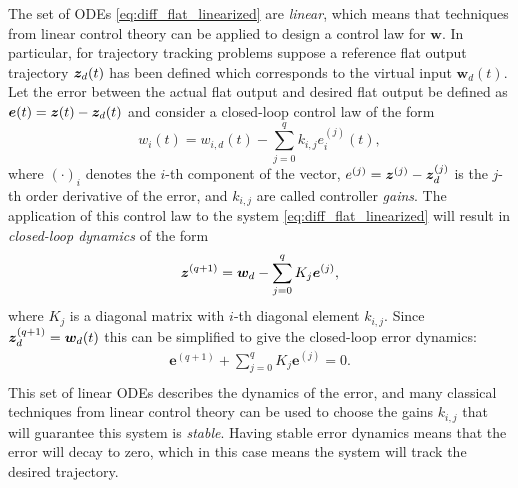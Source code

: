 The set of ODEs \eqref{eq:diff_flat_linearized} are \textit{linear}, which means that techniques from linear control theory can be applied to design a control law for $\bm{w}$. In particular, for trajectory tracking problems suppose a reference flat output trajectory $\bm{z}_d(t)$ has been defined which corresponds to the virtual input $\bm{w}_d(t)$. Let the error between the actual flat output and desired flat output be defined as $\bm{e}(t) = \bm{z}(t) - \bm{z}_d(t)$ and consider a closed-loop control law of the form
\begin{equation}
w_i(t) = w_{i,d}(t) - \sum_{j=0}^q k_{i,j} e_i^{(j)}(t),
\end{equation}
where $(\cdot)_i$ denotes the $i$-th component of the vector, $e^{(j)} = \bm{z}^{(j)} - \bm{z}_d^{(j)}$ is the $j$-th order derivative of the error, and $k_{i,j}$ are called controller \textit{gains}.
The application of this control law to the system \eqref{eq:diff_flat_linearized} will result in \textit{closed-loop dynamics} of the form
\begin{equation*}
\begin{split}
\bm{z}^{(q+1)} &= \bm{w}_d - \sum_{j=0}^q K_j \bm{e}^{(j)}, \\
\end{split}
\end{equation*}
where $K_j$ is a diagonal matrix with $i$-th diagonal element $k_{i,j}$. Since $\bm{z}_d^{(q+1)} = \bm{w}_d(t)$ this can be simplified to give the closed-loop error dynamics:
\begin{equation}
\begin{split}
\bm{e}^{(q+1)} + \sum_{j=0}^q K_j \bm{e}^{(j)} = 0. \\
\end{split}
\end{equation}
This set of linear ODEs describes the dynamics of the error, and many classical techniques from linear control theory can be used to choose the gains $k_{i,j}$ that will guarantee this system is \textit{stable}. Having stable error dynamics means that the error will decay to zero, which in this case means the system will track the desired trajectory.


